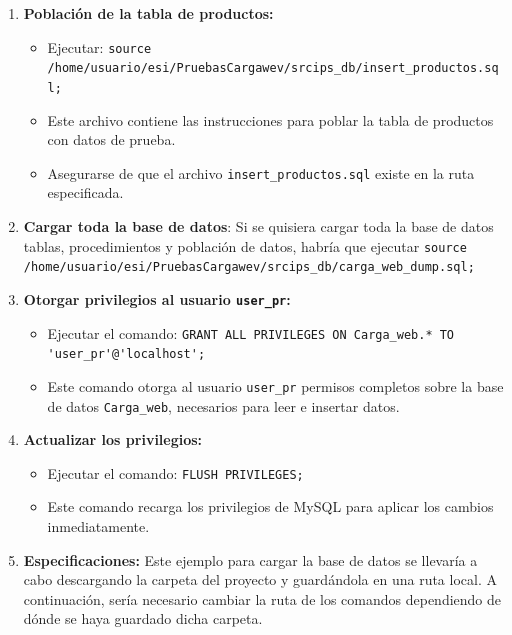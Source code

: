 \documentclass[10pt]{book}
\begin{document}
\begin{enumerate}
\begin{itemize}
            \item Ejecutar: \lstinline{source /home/usuario/esi/PruebasCargawev/srcips_db/procedimientos.sql;}
            \item Este archivo contiene las instrucciones para crear los procedimientos almacenados necesarios.
            \item Verificar que el archivo \texttt{procedimientos.sql} esté presente en la ubicación indicada.
        \end{itemize}
        
        \item \textbf{Población de la tabla de productos:}
        \begin{itemize}
            \item Ejecutar: \lstinline{source /home/usuario/esi/PruebasCargawev/srcips_db/insert_productos.sql;}
            \item Este archivo contiene las instrucciones para poblar la tabla de productos con datos de prueba.
            \item Asegurarse de que el archivo \texttt{insert\_productos.sql} existe en la ruta especificada.
        \end{itemize}
        \item \textbf{Cargar toda la base de datos}: Si se quisiera cargar toda la base de datos tablas, procedimientos y población de datos, habría que ejecutar  \lstinline{source /home/usuario/esi/PruebasCargawev/srcips_db/carga_web_dump.sql;}
        
        \item \textbf{Otorgar privilegios al usuario \texttt{user\_pr}:}
        \begin{itemize}
            \item Ejecutar el comando: \lstinline{GRANT ALL PRIVILEGES ON Carga_web.* TO 'user_pr'@'localhost';}
            \item Este comando otorga al usuario \texttt{user\_pr} permisos completos sobre la base de datos \texttt{Carga\_web}, necesarios para leer e insertar datos.
        \end{itemize}
    
        \item \textbf{Actualizar los privilegios:}
        \begin{itemize}
            \item Ejecutar el comando: \lstinline{FLUSH PRIVILEGES;}
            \item Este comando recarga los privilegios de MySQL para aplicar los cambios inmediatamente.
        \end{itemize}
        \item \textbf{Especificaciones:} Este ejemplo para cargar la base de datos se llevaría a cabo descargando la carpeta del proyecto y guardándola en una ruta local. A continuación, sería necesario cambiar la ruta de los comandos dependiendo de dónde se haya guardado dicha carpeta.
        
    \end{enumerate}
\end{document}
